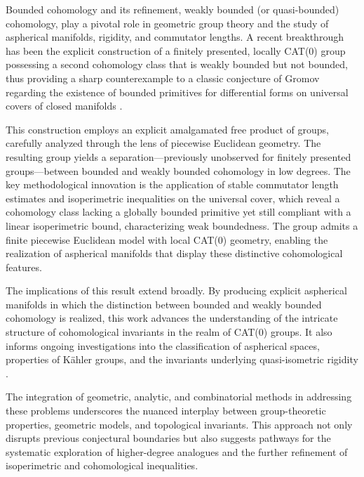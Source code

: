 \documentclass[sigconf]{acmart}
\begin{document}
Bounded cohomology and its refinement, weakly bounded (or quasi-bounded) cohomology, play a pivotal role in geometric group theory and the study of aspherical manifolds, rigidity, and commutator lengths. A recent breakthrough has been the explicit construction of a finitely presented, locally CAT(0) group possessing a second cohomology class that is weakly bounded but not bounded, thus providing a sharp counterexample to a classic conjecture of Gromov regarding the existence of bounded primitives for differential forms on universal covers of closed manifolds \cite{ref84}.

This construction employs an explicit amalgamated free product of groups, carefully analyzed through the lens of piecewise Euclidean geometry. The resulting group yields a separation—previously unobserved for finitely presented groups—between bounded and weakly bounded cohomology in low degrees. The key methodological innovation is the application of stable commutator length estimates and isoperimetric inequalities on the universal cover, which reveal a cohomology class lacking a globally bounded primitive yet still compliant with a linear isoperimetric bound, characterizing weak boundedness. The group admits a finite piecewise Euclidean model with local CAT(0) geometry, enabling the realization of aspherical manifolds that display these distinctive cohomological features.

The implications of this result extend broadly. By producing explicit aspherical manifolds in which the distinction between bounded and weakly bounded cohomology is realized, this work advances the understanding of the intricate structure of cohomological invariants in the realm of CAT(0) groups. It also informs ongoing investigations into the classification of aspherical spaces, properties of Kähler groups, and the invariants underlying quasi-isometric rigidity \cite{ref84}. 

The integration of geometric, analytic, and combinatorial methods in addressing these problems underscores the nuanced interplay between group-theoretic properties, geometric models, and topological invariants. This approach not only disrupts previous conjectural boundaries but also suggests pathways for the systematic exploration of higher-degree analogues and the further refinement of isoperimetric and cohomological inequalities. 
\end{document}
